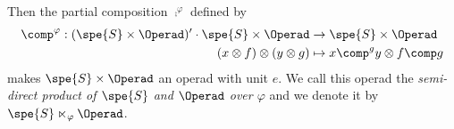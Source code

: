 \begin{prop}
\begin{description}
    \end{description}
    Then the partial composition $\comp^{\varphi}$ defined by
    \begin{equation}\begin{split}
        \comp^{\varphi}: (\spe{S}\times\Operad)'\cdot \spe{S}\times\Operad &\to \spe{S}\times\Operad \\
        (x\otimes f)\otimes (y\otimes g) &\mapsto x\comp^g y\otimes f\comp g
    \end{split}\end{equation}
    makes $\spe{S}\times\Operad$ an operad with unit $e$. We call this operad the {\em semi-direct product 
    of $\spe{S}$ and $\Operad$ over $\varphi$} and we denote it by $\spe{S}\ltimes_{\varphi}\Operad$.
\end{prop}

